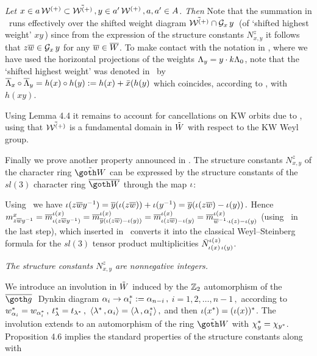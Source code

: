  {\it Let $x\in a\,{\cal W}^{(+)}\subset \tilde{{\cal W}^{(+)}}\,, y\in a'\,{\cal W}^{(+)}\,, 
a,a'\in A$. Then }
%
\eqn{}
%
%
\eqn{}
%
Note that the summation in \weyl\ runs effectively over the
shifted weight diagram $\tilde{{\cal W}^{(+)}}\cap {\cal G}_x\,y\,$ (of `shifted highest
weight' $xy\,$) since from the expression of the structure
constants $N^{z}_{x,y}$ it follows that $z\overline w\in {\cal G}_x\,y$ for
any $\overline w\in \overline W$.  To make contact with the notation in \FGP,
where we have used the horizontal projections  of the
weights $\Lambda_y=y\cdot k\Lambda_0$, note that the `shifted highest
weight' was denoted in \FGP\ by $\overline{\Lambda}_x\circ\overline{\Lambda}_y
=h(x)\circ h(y):=h(x)+ \bar{x}(h(y)$ which coincides,
according to \hor{}, with $ h(x y)$.

\PROOF
Using Lemma 4.4  it remains
to account for  cancellations on KW orbits due to \resa, using
that $\tilde{{\cal W}^{(+)}}$ is a fundamental domain in $\tilde W$ with respect to the
KW Weyl group.
\endPROOF


Finally we prove another property announced in \FGP.  The
structure constants $N^{z}_{x,y}$ of the character ring $\tCR$
can be expressed by  the structure constants of the $sl(3)$
character ring  $\overline{\CR}$ through the map $\iota$:

%
\eqn{}
%
\PROOF
Using \tlg\ we have $\iota(z\overline w y^{-1}) = \overline{y}(\iota(z\overline w)) +
\iota(y^{-1}) =\overline{y}(\iota(z\overline w) - \iota(y))\,. $ Hence $
m^{x}_{z\overline w y^{-1}}= \overline{m}^{\iota(x)}_{\iota(z\overline w y^{-1})} =
\overline{m}^{\iota(x)}_{\overline{y}(\iota(z\overline w) - \iota(y))}
= \overline{m}^{\iota(x)}_{\iota(z\overline w) - \iota(y)} =
\overline{m}^{\iota(x)}_{\overline w^{-1}\cdot\iota(z) - \iota(y)}$ (using \Ic\ in
the last step), which inserted in \strc\ converts it into the
classical Weyl--Steinberg formula for the $sl(3)$  tensor product
multiplicities $\bar{N}^{\iota(z)}_{\iota(x)\,\iota(y)}$.
\endPROOF

 {\it The structure constants 
$N_{x,y}^z$ are nonnegative integers.}

We introduce an involution in $\tilde W$ induced by the $\Bbb Z_2$
automorphism of the $\bgo \ $ Dynkin diagram $\alpha_i\rightarrow
\alpha_i^*:= \alpha_{n-i}\,,$  $i=1,2,\dots,n-1\,,$ according to
$w_{\alpha_i}^*=w_{\alpha_i^*}\,,$ $t_{\lambda}^*=t_{\lambda^*}\,, \
\langle\lambda^*\,, \alpha_i\rangle= \langle\lambda\,, \alpha_i^*\rangle\,,$ and then
$\iota(x^*)=(\iota(x))^*$.  The involution extends to an
automorphism of the ring $\tCR$ with $\chi_y^*=\chi_{y^*}$.
Proposition 4.6 implies the standard properties of the structure
constants
%
\eqn{}
%
along with 
%
\eqn{}
%

